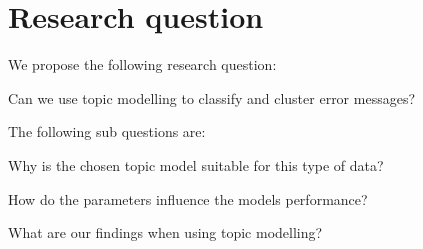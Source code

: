 \section{Research question}
We propose the following research question:

Can we use topic modelling to classify and cluster error messages?

The following sub questions are:

Why is the chosen topic model suitable for this type of data?

How do the parameters influence the models performance?

What are our findings when using topic modelling?


\begin{comment}
What are the optimal parameters?

What are the pro's and con's of using LDA?

subquestions:
Why is LDA suitable for this type of data 

How do the parameters influence the models performance?

What are the pro's and con's of using LDA?

What other methods are available to solve this error clustering?


\end{comment}


\begin{comment}

How do we define similair messages?

Can we cluster these error messages to find patterns?

Wat ik zou verwachten in je scriptie zijn de volgende topics
•	Wat is het probleem (de probleemstelling)?
•	Welke mogelijkheden zijn er om dit probleem op te lossen?
•	Welke methode heb je gekozen, en vooral uitleggen waarom deze methode volgens jou de beste is?
•	Hoe heb je vastgesteld dat de gekozen oplossing de beste is?
•	Wat is de uitkomst?
•	Wat zijn de voor en nadelen van het gekozen model, wat zijn de beperkingen, wat is de optimale modelering en waarom?
Zijn deze onderwerpen voldoende afgedicht in onderstaande structuur?

Ik ben veel meer geïnteresseerd in de onderbouwing:
•	Wat is de (onze) probleem omschrijving
Finding structures in syslogs to cluster undiscovered syslogs with errors
•	Waarom kies je LDA om dit probleem te lijf te gaan
o	Pro’s / con’s
o	Alternatieven
•	Hoe moet LDA gebruikt worden
o	Welke specifieke tuning heb je gebruikt
o	Hoe beinvloed de aanpassingen van parameters de uitkomst


\textbf{Can we make a reliable model for error detection in system logs?}

 \end{comment}
 
